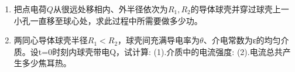 
\begin{enumerate}
\item 把点电荷$Q$从很远处移相内、外半径依次为$R_1,R_2$的导体球壳并穿过球壳上一小孔一直移至球心处，求此过程中所需要做多少功。
\item 两同心导体球壳半径$R_1<R_2$，球壳间充满导电率为$\theta$、介电常数为ε的均匀介质。设t=0时刻内球壳带电Q，试计算:
(1).介质中的电流强度:
(2).电流总共产生多少焦耳热。
\end{enumerate}